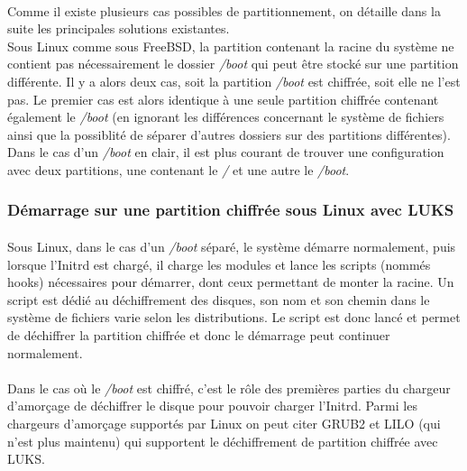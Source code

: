 \paragraph{}
Comme il existe plusieurs cas possibles de partitionnement, on détaille dans la
suite les principales solutions existantes.
\\
Sous Linux comme sous FreeBSD, la partition contenant la racine du système ne
contient pas nécessairement le dossier {\em /boot} qui peut être stocké sur une
partition différente. Il y a alors deux cas, soit la partition {\em /boot} est
chiffrée, soit elle ne l'est pas. Le premier cas est alors identique à une seule
partition chiffrée contenant également le {\em /boot} (en ignorant les
différences concernant le système de fichiers ainsi que la possiblité de séparer
d'autres dossiers sur des partitions différentes). Dans le cas d'un {\em /boot}
en clair, il est plus courant de trouver une configuration avec deux partitions,
une contenant le {\em /} et une autre le {\em /boot}.

\subsubsection{Démarrage sur une partition chiffrée sous Linux avec LUKS}

\paragraph{}
Sous Linux, dans le cas d'un {\em /boot} séparé, le système démarre normalement,
puis lorsque l'Initrd est chargé, il charge les modules et lance les scripts
(nommés hooks) nécessaires pour démarrer, dont ceux permettant de monter la
racine. Un script est dédié au déchiffrement des disques, son nom et son chemin
dans le système de fichiers varie selon les distributions. Le script est donc
lancé et permet de déchiffrer la partition chiffrée et donc le démarrage
peut continuer normalement.

\paragraph{}
Dans le cas où le {\em /boot} est chiffré, c'est le rôle des premières parties
du chargeur d'amorçage de déchiffrer le disque pour pouvoir charger l'Initrd. Parmi les
chargeurs d'amorçage supportés par Linux on peut citer GRUB2 et LILO
(qui n'est plus maintenu) qui supportent le déchiffrement de partition chiffrée
avec LUKS.

